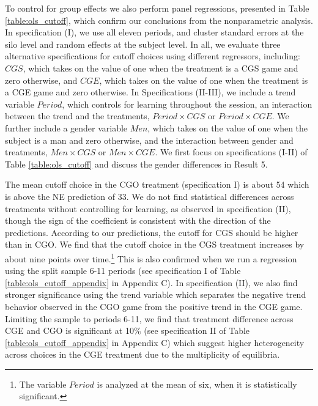 \documentclass[12pt, letterpaper]{article}
\theoremstyle{plain}
\begin{document}
To control for group effects we also perform panel regressions, presented in Table \ref{table:ols_cutoff}, which confirm our conclusions from the nonparametric analysis. In specification (I), we use all eleven periods, and cluster standard errors at the silo level and random effects at the subject level. In all, we evaluate three alternative specifications for cutoff choices using different regressors, including: $CGS$, which takes on the value of one when the treatment is a CGS game and zero otherwise, and $CGE$, which takes on the value of one when the treatment is a CGE game and zero otherwise. In Specifications (II-III), we include a trend variable $Period$, which controls for learning throughout the session, an interaction between the trend and the treatments, $Period \times CGS$ or $Period \times CGE$. We further include a gender variable $Men$, which takes on the value of one when the subject is a man and zero otherwise, and the interaction between gender and treatments, $Men \times CGS$ or $Men \times CGE$. We first focus on specifications (I-II) of Table \ref{table:ols_cutoff} and discuss the gender differences in Result 5. 

The mean cutoff choice in the CGO treatment (specification I) is about 54 which is above the NE prediction of 33. We do not find statistical differences across treatments without controlling for learning, as observed in specification (II), though the sign of the coefficient is consistent with the direction of the predictions. According to our predictions, the cutoff for CGS should be higher than in CGO. We find that the cutoff choice in the CGS treatment increases by about nine points over time.\footnote{The variable $Period$ is analyzed at the mean of six, when it is statistically significant.} This is also confirmed when we run a regression using the split sample 6-11 periods (see specification I of Table \ref{table:ols_cutoff_appendix} in Appendix C). In specification (II), we also find stronger significance using the trend variable which separates the negative trend behavior observed in the CGO game from the positive trend in the CGE game. Limiting the sample to periods 6-11, we find that treatment difference across CGE and CGO is significant at 10\% (see specification II of Table \ref{table:ols_cutoff_appendix} in Appendix C) which suggest higher heterogeneity across choices in the CGE treatment due to the multiplicity of equilibria. 
\end{document}
